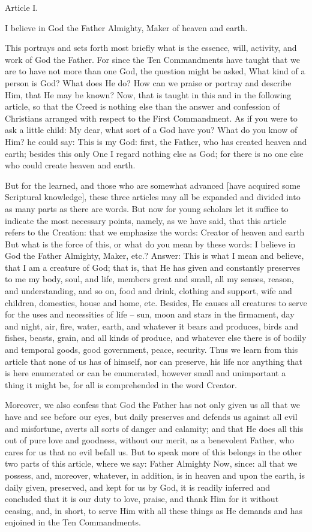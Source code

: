 Article I.

I believe in God the Father Almighty, Maker of heaven and earth.

This portrays and sets forth most briefly what is the essence, will,
activity, and work of God the Father. For since the Ten Commandments
have taught that we are to have not more than one God, the question
might be asked, What kind of a person is God? What does He do? How can
we praise or portray and describe Him, that He may be known? Now, that
is taught in this and in the following article, so that the Creed is
nothing else than the answer and confession of Christians arranged with
respect to the First Commandment. As if you were to ask a little child:
My dear, what sort of a God have you? What do you know of Him? he could
say: This is my God: first, the Father, who has created heaven and
earth; besides this only One I regard nothing else as God; for there is
no one else who could create heaven and earth.

But for the learned, and those who are somewhat advanced [have
acquired some Scriptural knowledge], these three articles may all be
expanded and divided into as many parts as there are words. But now for
young scholars let it suffice to indicate the most necessary points,
namely, as we have said, that this article refers to the Creation: that
we emphasize the words: Creator of heaven and earth But what is the
force of this, or what do you mean by these words: I believe in God the
Father Almighty, Maker, etc.? Answer: This is what I mean and believe,
that I am a creature of God; that is, that He has given and constantly
preserves to me my body, soul, and life, members great and small, all
my senses, reason, and understanding, and so on, food and drink,
clothing and support, wife and children, domestics, house and home,
etc. Besides, He causes all creatures to serve for the uses and
necessities of life -- sun, moon and stars in the firmament, day and
night, air, fire, water, earth, and whatever it bears and produces,
birds and fishes, beasts, grain, and all kinds of produce, and whatever
else there is of bodily and temporal goods, good government, peace,
security. Thus we learn from this article that none of us has of
himself, nor can preserve, his life nor anything that is here
enumerated or can be enumerated, however small and unimportant a thing
it might be, for all is comprehended in the word Creator.

Moreover, we also confess that God the Father has not only given us all
that we have and see before our eyes, but daily preserves and defends
us against all evil and misfortune, averts all sorts of danger and
calamity; and that He does all this out of pure love and goodness,
without our merit, as a benevolent Father, who cares for us that no
evil befall us. But to speak more of this belongs in the other two
parts of this article, where we say: Father Almighty
Now, since: all that we possess, and, moreover, whatever, in addition,
is in heaven and upon the earth, is daily given, preserved, and kept
for us by God, it is readily inferred and concluded that it is our duty
to love, praise, and thank Him for it without ceasing, and, in short,
to serve Him with all these things as He demands and has enjoined in
the Ten Commandments.


